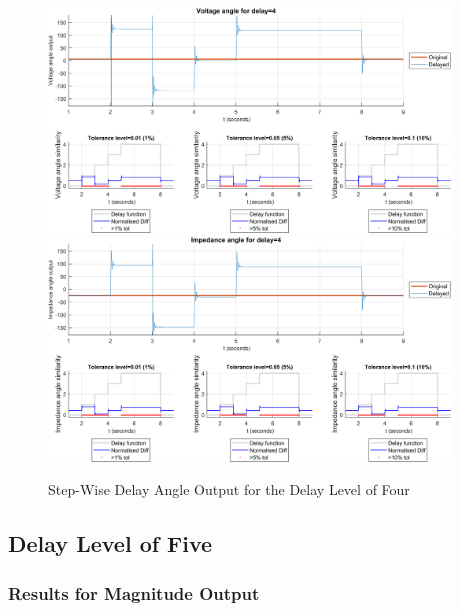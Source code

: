 \begin{figure}
    \caption{Step-Wise Delay Angle Output for the Delay Level of Four}
    \includegraphics[width=0.95\textwidth]{PMUsim-figures/DelayOf_4/Step_vAngle.png}    
    \includegraphics[width=0.95\textwidth]{PMUsim-figures/DelayOf_4/Step_iAngle.png}    
    \label{fig:PMUsimStep_Four_Angle}
        \begin{small}
     \end{small}
\end{figure}

\newpage \subsection{Delay Level of Five}
\subsubsection{Results for Magnitude Output}

